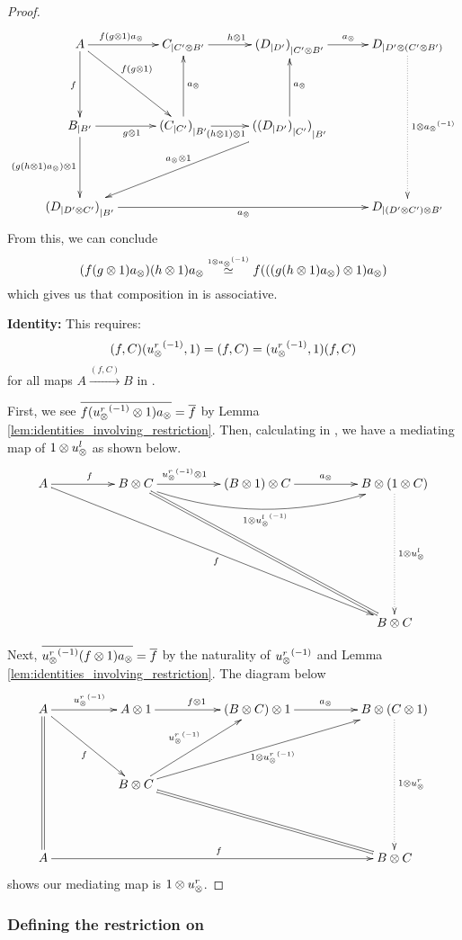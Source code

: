 \begin{proof}
  \[
    \xymatrix @C=30pt @R=45pt{
      A \ar[d]_f \ar[r]^(.4){f (g\*1) a_{\*}} \ar[dr]^(.4){f(g\*1)} &
        \xtdmn{C}{C' \* B'} \ar[r]^{h\*1}
        & \xtdmn{(\xtdmn{D}{D'})}{C' \* B'} \ar[r]^{a_{\*}}
        & \xtdmn{D}{D' \* (C' \* B')}
        \ar@{.>}[dd]^{1\*\inv{a_{\*}}}\\
      \xtdmn{B}{B'} \ar[d]_{(g (h\*1) a_{\*})\*1} \ar[r]_{g\*1}
        &\xtdmn{(\xtdmn{C}{C'})}{B'} \ar[u]_{a_{\*}} \ar[r]_(.4){(h\*1)\*1}
        & \xtdmn{(\xtdmn{(\xtdmn{D}{D'})}{C'})}{B'}
        \ar[u]_{a_\*} \ar[dll]_{a_{\*}\*1}
      \\
      \xtdmn{(\xtdmn{D}{D' \* C'})}{B'}  \ar[rrr]_{a_{\*}}
        &&& \xtdmn{D}{(D' \* C') \* B'} %
    }
  \]
  From this, we can conclude
  \[
    (f(g\otimes1)a_{\otimes}) (h\otimes1)a_{\otimes} \overset{\scriptscriptstyle 1\otimes{a_{\otimes}}^{(-1)}}{\simeq} f (((g(h\otimes1)a_{\otimes})\otimes1) a_{\otimes})
  \]
  which gives us that composition in \Xt is associative.

  \textbf{Identity:} This requires:
  \[
    (f,C) ({u_{\otimes}^r}^{(-1)}, 1) = (f,C) = ({u_{\otimes}^r}^{(-1)}, 1) (f,C)
  \]
  for all maps $A\xrightarrow{(f,C)}B$ in \Xt.

  First, we see $\overline{f ({u_{\otimes}^r}^{(-1)}\otimes1) a_{\otimes}} = \overline{f}$ by Lemma
  \vref{lem:identities_involving_restriction}. Then, calculating in \X, we have a mediating map of
  $1 \otimes u_{\otimes}^l$ as shown below.
  \[
    \xymatrix @C=50pt @R=45pt{
      A \ar[r]^f \ar[ddrrr]_f&
        B \* C \ar[r]^(.4){\inv{\usr}\*1}
        \ar@/_20pt/[rr]_{1 \* \inv{\usl}}
        \ar@{=}[ddrr]
        & (B \* 1) \* C \ar[r]^{a_{\*}}
        & B \* (1 \* C) \ar@{.>}[dd]^{1 \* \usl} \\
      \\
      &&& B \* C
    }
  \]

  Next, $\overline{{u_{\otimes}^r}^{(-1)} (f \otimes1)  a_{\otimes}} = \overline{f}$ by the naturality of ${u_{\otimes}^r}^{(-1)}$ and
  Lemma \vref{lem:identities_involving_restriction}. The diagram below
  \[
    \xymatrix @C=50pt @R=45pt{
      A \ar@{=}[dd] \ar[r]^{\inv{\usr}} \ar[dr]_{f}
        &      A \* 1 \ar[r]^{f \* 1}
        & (B \* C) \* 1 \ar[r]^{a_{\*}}
        & B \* (C \* 1)\ar@{.>}[dd]^{1 \* \usr} \\
      &B\*C \ar[ur]^{\inv{\usr}} \ar[urr]_{1\*\inv{\usr}} \ar@{=}[drr]\\
      A \ar[rrr]^f &&& B \* C
    }
  \]
  shows our mediating map is $1 \otimes u_{\otimes}^r$.
\end{proof}

\subsubsection{Defining the restriction on \hypXt} %
\label{ssub:defining_the_restriction_on_hypxt}



